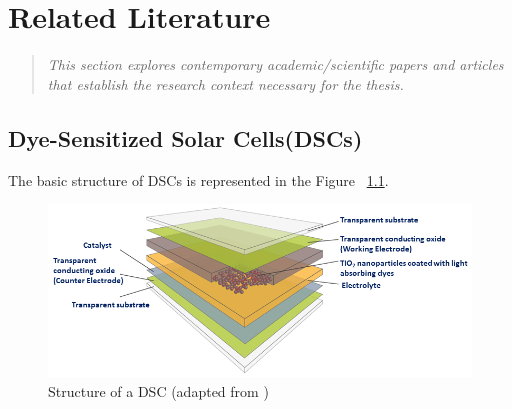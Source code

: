 \chapter{Related Literature}
\begin{quote} 
\textit{This section explores contemporary academic/scientific papers and articles that establish the research context necessary for the thesis.} 
\end{quote}


  
\section{Dye-Sensitized Solar Cells(DSCs)}

The basic structure of \ac{DSCs} is represented in the Figure ~\ref{fig:DSC_struc}. 

\begin{figure}[H]
\begin{center}
\includegraphics[width=\textwidth]{images/DSCs_struc}
\caption{Structure of a DSC (adapted from \cite{exeger_cell_sand}) }
\label{fig:DSC_struc}
\end{center}
\end{figure}

